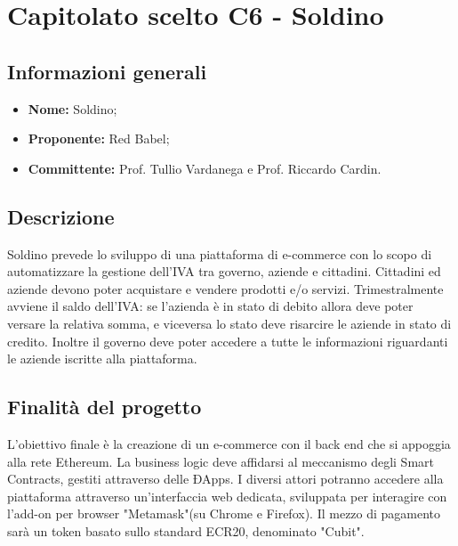 \section{Capitolato scelto C6 - Soldino}
\subsection{Informazioni generali}
% 
\begin{itemize}
\item \textbf{Nome:} Soldino;
\item \textbf{Proponente:} Red Babel;
\item \textbf{Committente:} Prof. Tullio Vardanega e Prof. Riccardo Cardin.
\end{itemize}

\subsection{Descrizione}
Soldino prevede lo sviluppo di una piattaforma di e-commerce con lo scopo di automatizzare la gestione dell'IVA tra governo, aziende e cittadini. Cittadini ed aziende devono poter acquistare e vendere prodotti e/o servizi. Trimestralmente avviene il saldo dell'IVA: se l'azienda è in stato di debito allora deve poter versare la relativa somma, e viceversa lo stato deve risarcire le aziende in stato di credito. Inoltre il governo deve poter accedere a tutte le informazioni riguardanti le aziende iscritte alla piattaforma.

\subsection{Finalità del progetto}
L’obiettivo finale è la creazione di un e-commerce con il back end che si appoggia alla rete Ethereum\glo. La business logic deve affidarsi al meccanismo degli Smart Contracts\glo, gestiti attraverso delle ÐApps\glo. I diversi
attori potranno accedere alla piattaforma attraverso un’interfaccia web dedicata, sviluppata per interagire con l'add-on per browser "Metamask"\glosp (su Chrome e Firefox). Il mezzo di pagamento sarà un token basato sullo standard ECR20\glo, denominato "Cubit"\glo.



